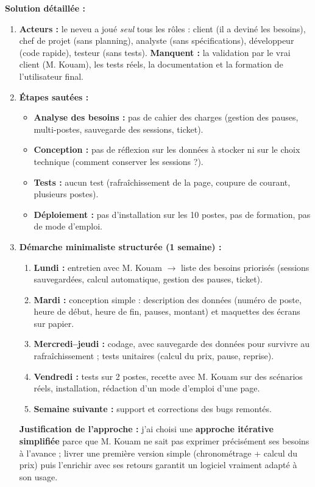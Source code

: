 \documentclass[11pt]{article}
\begin{document}
\begin{exoresolu}
\tcblower
\textbf{Solution détaillée :}
\begin{enumerate}
    \item \textbf{Acteurs :} le neveu a joué \emph{seul} tous les rôles : client (il a deviné les besoins), chef de projet (sans planning), analyste (sans spécifications), développeur (code rapide), testeur (sans tests). \textbf{Manquent :} la validation par le vrai client (M. Kouam), les tests réels, la documentation et la formation de l'utilisateur final.
    \item \textbf{Étapes sautées :}
        \begin{itemize}
            \item \textbf{Analyse des besoins :} pas de cahier des charges (gestion des pauses, multi-postes, sauvegarde des sessions, ticket).
            \item \textbf{Conception :} pas de réflexion sur les données à stocker ni sur le choix technique (comment conserver les sessions ?).
            \item \textbf{Tests :} aucun test (rafraîchissement de la page, coupure de courant, plusieurs postes).
            \item \textbf{Déploiement :} pas d'installation sur les 10 postes, pas de formation, pas de mode d'emploi.
        \end{itemize}
    \item \textbf{Démarche minimaliste structurée (1 semaine) :}
        \begin{enumerate}
            \item \textbf{Lundi :} entretien avec M. Kouam $\rightarrow$ liste des besoins priorisés (sessions sauvegardées, calcul automatique, gestion des pauses, ticket).
            \item \textbf{Mardi :} conception simple : description des données (numéro de poste, heure de début, heure de fin, pauses, montant) et maquettes des écrans sur papier.
            \item \textbf{Mercredi--jeudi :} codage, avec sauvegarde des données pour survivre au rafraîchissement ; tests unitaires (calcul du prix, pause, reprise).
            \item \textbf{Vendredi :} tests sur 2 postes, recette avec M. Kouam sur des scénarios réels, installation, rédaction d'un mode d'emploi d'une page.
            \item \textbf{Semaine suivante :} support et corrections des bugs remontés.
        \end{enumerate}
        \textbf{Justification de l'approche :} j'ai choisi une \textbf{approche itérative simplifiée} parce que M. Kouam ne sait pas exprimer précisément ses besoins à l'avance ; livrer une première version simple (chronométrage + calcul du prix) puis l'enrichir avec ses retours garantit un logiciel vraiment adapté à son usage.
\end{enumerate}
\end{exoresolu}
\end{document}
